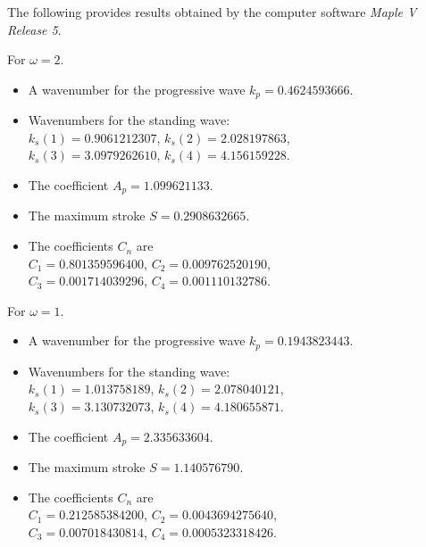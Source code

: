 \documentclass[12pt,a4paper]{report}
\begin{document}
The following provides results obtained by the computer software \emph{Maple V Release 5}.
\begin{description}[leftmargin=1.3em]
\item[\textbf{a.}]  For $\omega = 2$.
\begin{itemize}[leftmargin=0.8em]
\item A wavenumber for the progressive wave $k_{p} = 0.4624593666$.

\item Wavenumbers for the standing wave:\\
\hspace*{1em} $k_{s}(1) = 0.9061212307$, \qquad \qquad $k_{s}(2) = 2.028197863$, \\
\hspace*{1em} $k_{s}(3) = 3.0979262610$, \qquad \qquad $k_{s}(4) = 4.156159228$.

\item The coefficient $A_{p} = 1.099621133$.

\item The maximum stroke $S = 0.2908632665$.

\item The coefficients $C_{n}$ are \\
\hspace*{1em} $C_{1} = 0.801359596400$, \qquad \qquad $C_{2} = 0.009762520190$, \\
\hspace*{1em} $C_{3} = 0.001714039296$, \qquad \qquad $C_{4} = 0.001110132786$.
\end{itemize}

\item[\textbf{b.}] For $\omega = 1$.
\begin{itemize}[leftmargin=0.8em]
\item A wavenumber for the progressive wave $k_{p} = 0.1943823443$.

\item Wavenumbers for the standing wave: \\
\hspace*{1em} $k_{s}(1) = 1.013758189$, \qquad \qquad $k_{s}(2) = 2.078040121$, \\
\hspace*{1em} $k_{s}(3) = 3.130732073$, \qquad \qquad $k_{s}(4) = 4.180655871$.

\item The coefficient $A_{p} = 2.335633604$.

\item The maximum stroke $S = 1.140576790$.

\item The coefficients $C_{n}$ are \\
\hspace*{1em} $C_{1} = 0.212585384200$, \qquad \qquad $C_{2} = 0.0043694275640$, \\
\hspace*{1em} $C_{3} = 0.007018430814$, \qquad \qquad $C_{4} = 0.0005323318426$.
\end{itemize}
\end{description}
\end{document}
